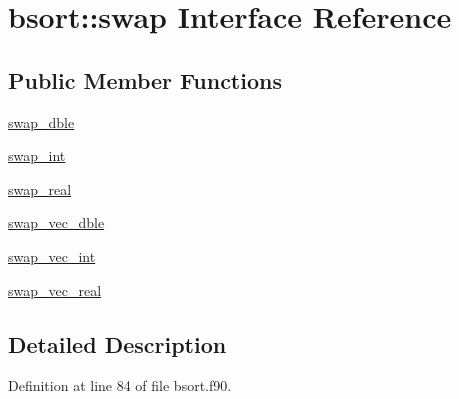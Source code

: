 \hypertarget{interfacebsort_1_1swap}{\section{bsort\-:\-:swap Interface Reference}
\label{interfacebsort_1_1swap}
}
\subsection*{Public Member Functions}
\begin{DoxyCompactItemize}
\item 
\hyperlink{interfacebsort_1_1swap_ae909c13b184470044270a2b48e5ad287_ae909c13b184470044270a2b48e5ad287}{swap\-\_\-dble}
\item 
\hyperlink{interfacebsort_1_1swap_a6505048f59a461180a52b17c2adcc762_a6505048f59a461180a52b17c2adcc762}{swap\-\_\-int}
\item 
\hyperlink{interfacebsort_1_1swap_a63e6bcf8f3657b5528fe4ccfea705ae9_a63e6bcf8f3657b5528fe4ccfea705ae9}{swap\-\_\-real}
\item 
\hyperlink{interfacebsort_1_1swap_a90c98132ef0a3c34e60ae4dfb8f4857e_a90c98132ef0a3c34e60ae4dfb8f4857e}{swap\-\_\-vec\-\_\-dble}
\item 
\hyperlink{interfacebsort_1_1swap_a03db378f3e6599b3e4172b5edb9e823e_a03db378f3e6599b3e4172b5edb9e823e}{swap\-\_\-vec\-\_\-int}
\item 
\hyperlink{interfacebsort_1_1swap_a65e5de7b2a4a93f76545b977335c163b_a65e5de7b2a4a93f76545b977335c163b}{swap\-\_\-vec\-\_\-real}
\end{DoxyCompactItemize}


\subsection{Detailed Description}


Definition at line 84 of file bsort.\-f90.




